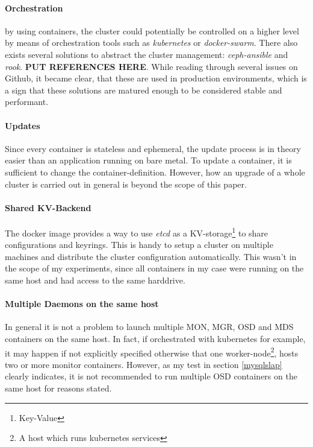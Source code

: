 \documentclass[titlepage, a4paper, 11pt]{scrartcl}
\begin{document}
            \paragraph{Orchestration} by using containers, the cluster could potentially be controlled on a higher level by means of orchestration tools such as \textit{kubernetes} or \textit{docker-swarm}. There also exists several solutions to abstract the cluster management: \textit{ceph-ansible} and \textit{rook}. \textbf{PUT REFERENCES HERE}. While reading through several issues on Github, it became clear, that these are used in production environments, which is a sign that these solutions are matured enough to be considered stable and performant.

            \paragraph{Updates} Since every container is stateless and ephemeral, the update process is in theory easier than an application running on bare metal. To update a container, it is sufficient to change the container-definition. However, how an upgrade of a whole cluster is carried out in general is beyond the scope of this paper.

            \paragraph{Shared KV-Backend} The docker image provides a way to use \textit{etcd} as a KV-storage\footnote{Key-Value} to share configurations and keyrings. This is handy to setup a cluster on multiple machines and distribute the cluster configuration automatically. This wasn't in the scope of my experiments, since all containers in my case were running on the same host and had access to the same harddrive.

            \paragraph{Multiple Daemons on the same host} In general it is not a problem to launch multiple MON, MGR, OSD and MDS containers on the same host. In fact, if orchestrated with kubernetes for example, it may happen if not explicitly specified otherwise that one worker-node\footnote{A host which runs kubernetes services}, hosts two or more monitor containers. However, as my test in section \ref{mysqlslap} clearly indicates, it is not recommended to run multiple OSD containers on the same host for reasons stated.
\end{document}
